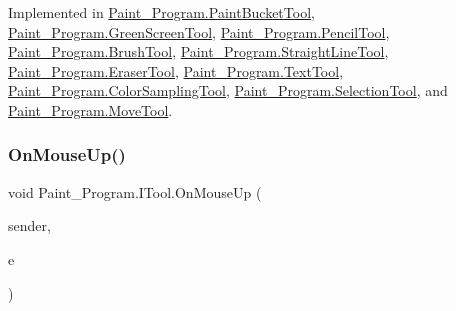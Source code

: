 Implemented in \mbox{\hyperlink{class_paint___program_1_1_paint_bucket_tool_a0a4dfeb323d746b531ece7d4a9e218a7}{Paint\+\_\+\+Program.\+Paint\+Bucket\+Tool}}, \mbox{\hyperlink{class_paint___program_1_1_green_screen_tool_a95699606ba5027c0671f4bc6ef86be93}{Paint\+\_\+\+Program.\+Green\+Screen\+Tool}}, \mbox{\hyperlink{class_paint___program_1_1_pencil_tool_a05d86241cc76eaf2abaa94b6ac3f5cfe}{Paint\+\_\+\+Program.\+Pencil\+Tool}}, \mbox{\hyperlink{class_paint___program_1_1_brush_tool_a4246e31217a616bf6bd251ac2b7ac4e3}{Paint\+\_\+\+Program.\+Brush\+Tool}}, \mbox{\hyperlink{class_paint___program_1_1_straight_line_tool_ad76feea781f953b41a22a940b1f12716}{Paint\+\_\+\+Program.\+Straight\+Line\+Tool}}, \mbox{\hyperlink{class_paint___program_1_1_eraser_tool_a1a4e26847ca43fc583017ea76396c19c}{Paint\+\_\+\+Program.\+Eraser\+Tool}}, \mbox{\hyperlink{class_paint___program_1_1_text_tool_a25bd60db2eeff1a131bce076e7f68757}{Paint\+\_\+\+Program.\+Text\+Tool}}, \mbox{\hyperlink{class_paint___program_1_1_color_sampling_tool_a509ae51233092f2722e44301897ee085}{Paint\+\_\+\+Program.\+Color\+Sampling\+Tool}}, \mbox{\hyperlink{class_paint___program_1_1_selection_tool_adec8eaad22f0c7ac1a744247c87e16bc}{Paint\+\_\+\+Program.\+Selection\+Tool}}, and \mbox{\hyperlink{class_paint___program_1_1_move_tool_ad5062cb79928744a0b394f927eb4a41d}{Paint\+\_\+\+Program.\+Move\+Tool}}.

\mbox{\label{interface_paint___program_1_1_i_tool_a47984c2879213022f1684c07f7bba73e}} 
\subsubsection{\texorpdfstring{On\+Mouse\+Up()}{OnMouseUp()}}
{\footnotesize\ttfamily void Paint\+\_\+\+Program.\+I\+Tool.\+On\+Mouse\+Up (\begin{DoxyParamCaption}\item[{object}]{sender,  }\item[{Mouse\+Event\+Args}]{e }\end{DoxyParamCaption})}



